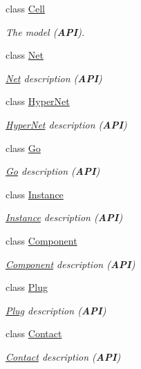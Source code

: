\begin{DoxyCompactItemize}
class \hyperlink{classHurricane_1_1Cell}{Cell}
\begin{DoxyCompactList}\small\item\em The model ({\bfseries A\-P\-I}). \end{DoxyCompactList}\item 
class \hyperlink{classHurricane_1_1Net}{Net}
\begin{DoxyCompactList}\small\item\em \hyperlink{classHurricane_1_1Net}{Net} description ({\bfseries A\-P\-I}) \end{DoxyCompactList}\item 
class \hyperlink{classHurricane_1_1HyperNet}{Hyper\-Net}
\begin{DoxyCompactList}\small\item\em \hyperlink{classHurricane_1_1HyperNet}{Hyper\-Net} description ({\bfseries A\-P\-I}) \end{DoxyCompactList}\item 
class \hyperlink{classHurricane_1_1Go}{Go}
\begin{DoxyCompactList}\small\item\em \hyperlink{classHurricane_1_1Go}{Go} description ({\bfseries A\-P\-I}) \end{DoxyCompactList}\item 
class \hyperlink{classHurricane_1_1Instance}{Instance}
\begin{DoxyCompactList}\small\item\em \hyperlink{classHurricane_1_1Instance}{Instance} description ({\bfseries A\-P\-I}) \end{DoxyCompactList}\item 
class \hyperlink{classHurricane_1_1Component}{Component}
\begin{DoxyCompactList}\small\item\em \hyperlink{classHurricane_1_1Component}{Component} description ({\bfseries A\-P\-I}) \end{DoxyCompactList}\item 
class \hyperlink{classHurricane_1_1Plug}{Plug}
\begin{DoxyCompactList}\small\item\em \hyperlink{classHurricane_1_1Plug}{Plug} description ({\bfseries A\-P\-I}) \end{DoxyCompactList}\item 
class \hyperlink{classHurricane_1_1Contact}{Contact}
\begin{DoxyCompactList}\small\item\em \hyperlink{classHurricane_1_1Contact}{Contact} description ({\bfseries A\-P\-I}) \end{DoxyCompactList}\item 

\end{DoxyCompactItemize}
